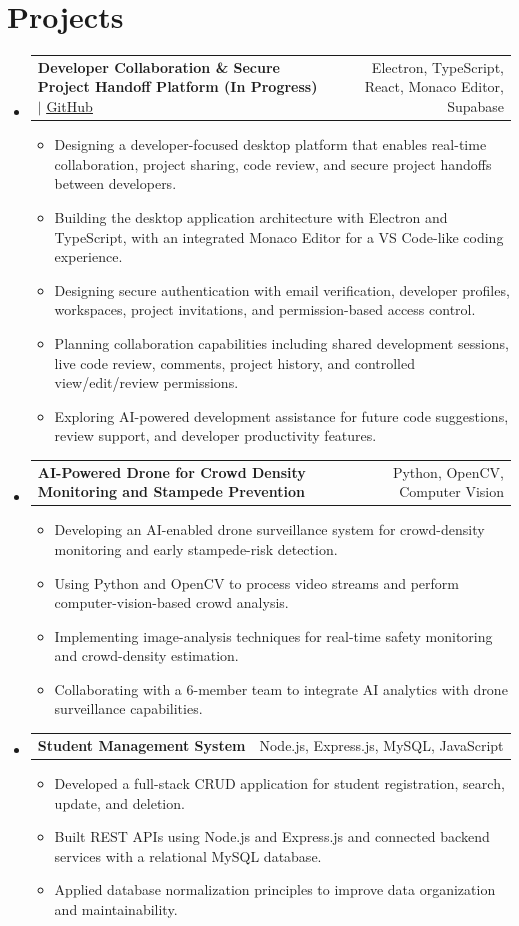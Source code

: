\documentclass[a4paper,10pt]{article}
\makeatletter
\newcommand{\resumeProjectHeading}[2]{
  \vspace{-1pt}\item
    \begin{tabular*}{0.98\textwidth}[t]{l@{\extracolsep{\fill}}r}
      #1 & #2 \\
    \end{tabular*}\vspace{-6pt}
}
\newcommand{\resumeItemListStart}{\begin{itemize}[leftmargin=0.15in, labelsep=0.08in, itemsep=2pt, parsep=0pt]}
\newcommand{\resumeItemListEnd}{\end{itemize}\vspace{-4pt}}
\makeatother
\begin{document}
\section{Projects}
  \begin{itemize}[leftmargin=0in, label={}]

    \resumeProjectHeading
      {\textbf{Developer Collaboration \& Secure Project Handoff Platform (In Progress)} $|$ \href{https://github.com/omkarsai24/omkar-portfolio}{\underline{GitHub}}}{Electron, TypeScript, React, Monaco Editor, Supabase}
      \resumeItemListStart
        \item Designing a developer-focused desktop platform that enables real-time collaboration, project sharing, code review, and secure project handoffs between developers.
        \item Building the desktop application architecture with Electron and TypeScript, with an integrated Monaco Editor for a VS Code-like coding experience.
        \item Designing secure authentication with email verification, developer profiles, workspaces, project invitations, and permission-based access control.
        \item Planning collaboration capabilities including shared development sessions, live code review, comments, project history, and controlled view/edit/review permissions.
        \item Exploring AI-powered development assistance for future code suggestions, review support, and developer productivity features.
      \resumeItemListEnd

    \resumeProjectHeading
      {\textbf{AI-Powered Drone for Crowd Density Monitoring and Stampede Prevention}}{Python, OpenCV, Computer Vision}
      \resumeItemListStart
        \item Developing an AI-enabled drone surveillance system for crowd-density monitoring and early stampede-risk detection.
        \item Using Python and OpenCV to process video streams and perform computer-vision-based crowd analysis.
        \item Implementing image-analysis techniques for real-time safety monitoring and crowd-density estimation.
        \item Collaborating with a 6-member team to integrate AI analytics with drone surveillance capabilities.
      \resumeItemListEnd

    \resumeProjectHeading
      {\textbf{Student Management System}}{Node.js, Express.js, MySQL, JavaScript}
      \resumeItemListStart
        \item Developed a full-stack CRUD application for student registration, search, update, and deletion.
        \item Built REST APIs using Node.js and Express.js and connected backend services with a relational MySQL database.
        \item Applied database normalization principles to improve data organization and maintainability.
      \resumeItemListEnd


\end{itemize}
\end{document}
